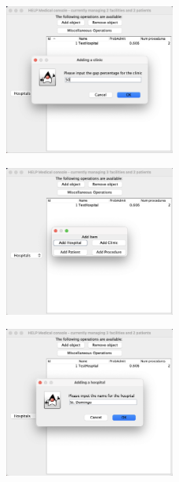 \documentclass{article}
\begin{document}
\begin{figure}
  \begin{center}
    \includegraphics[width=0.5\textwidth]{./figures/Add/Clinic_6.png}
  \end{center}
\end{figure}

\begin{figure}
  \begin{center}
    \includegraphics[width=0.5\textwidth]{./figures/Add/Hospital_1.png}
  \end{center}
\end{figure}

\begin{figure}
  \begin{center}
    \includegraphics[width=0.5\textwidth]{./figures/Add/Hospital_2.png}
  \end{center}
\end{figure}
\end{document}
